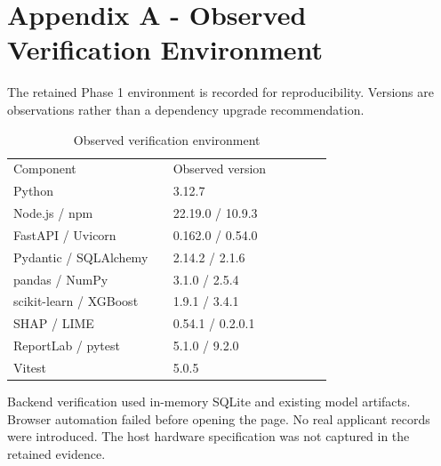 \documentclass[12pt,a4paper]{report}
\begin{document}
\chapter*{Appendix A - Observed Verification Environment}
The retained Phase 1 environment is recorded for reproducibility. Versions are observations rather than a dependency upgrade recommendation.

\begin{longtable}{p{0.46\linewidth}p{0.46\linewidth}}
\caption{Observed verification environment}\\

Component & Observed version\\
Python & 3.12.7\\
Node.js / npm & 22.19.0 / 10.9.3\\
FastAPI / Uvicorn & 0.162.0 / 0.54.0\\
Pydantic / SQLAlchemy & 2.14.2 / 2.1.6\\
pandas / NumPy & 3.1.0 / 2.5.4\\
scikit-learn / XGBoost & 1.9.1 / 3.4.1\\
SHAP / LIME & 0.54.1 / 0.2.0.1\\
ReportLab / pytest & 5.1.0 / 9.2.0\\
Vitest & 5.0.5\\
\end{longtable}
Backend verification used in-memory SQLite and existing model artifacts. Browser automation failed before opening the page. No real applicant records were introduced. The host hardware specification was not captured in the retained evidence.
\end{document}

